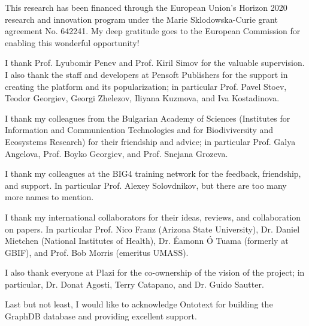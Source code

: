 \begin{acknowledgements}
\addchaptertocentry{\acknowledgementname} %

This research has been financed through the European Union’s Horizon 2020 research and innovation program under the Marie Sklodowska-Curie grant agreement No. 642241. My deep gratitude goes to the European Commission for enabling this wonderful opportunity!

\vspace{5mm}

I thank Prof. Lyubomir Penev and Prof. Kiril Simov for the valuable supervision. I also thank the staff and developers at Pensoft Publishers for the support in creating the platform and its popularization; in particular Prof. Pavel Stoev, Teodor Georgiev, Georgi Zhelezov, Iliyana Kuzmova, and Iva Kostadinova.

\vspace{5mm}

I thank my colleagues from the Bulgarian Academy of Sciences (Institutes for Information and Communication Technologies and for Biodiviversity and Ecosystems Research) for their friendship and advice; in particular Prof. Galya Angelova, Prof. Boyko Georgiev, and Prof. Snejana Grozeva.

\vspace{5mm}

I thank my colleagues at the BIG4 training network for the feedback, friendship, and support. In particular Prof. Alexey Solovdnikov, but there are too many more names to mention.

\vspace{5mm}

I thank my international collaborators for their ideas, reviews, and collaboration on papers. In particular Prof. Nico Franz (Arizona State University), Dr. Daniel Mietchen (National Institutes of Health), Dr.  Éamonn Ó Tuama (formerly at GBIF), and Prof. Bob Morris (emeritus UMASS).

\vspace{5mm}

I also thank everyone at Plazi for the co-ownership of the vision of the project; in particular, Dr. Donat Agosti, Terry Catapano, and Dr. Guido Sautter.

\vspace{5mm}

Last but not least, I would like to acknowledge Ontotext for building the GraphDB database and providing excellent support.



\end{acknowledgements}